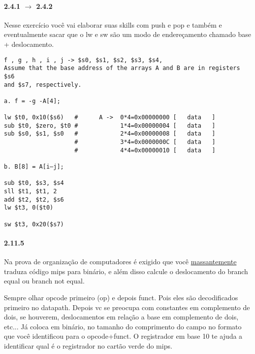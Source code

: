 \documentclass{article}
\begin{document}
\paragraph{2.4.1 $\rightarrow$ 2.4.2}

Nesse exercício você vai elaborar suas skills com push e pop e também e
eventualmente sacar que o lw e sw são um modo de endereçamento chamado base +
deslocamento.

\begin{verbatim}
f , g , h , i , j -> $s0, $s1, $s2, $s3, $s4,
Assume that the base address of the arrays A and B are in registers $s6
and $s7, respectively.

a. f = -g -A[4];

lw $t0, 0x10($s6)   #      A ->  0*4=0x00000000 [   data   ]
sub $t0, $zero, $t0 #            1*4=0x00000004 [   data   ]
sub $s0, $s1, $s0   #            2*4=0x00000008 [   data   ]
                    #            3*4=0x0000000C [   data   ]
                    #            4*4=0x00000010 [   data   ]

b. B[8] = A[i–j];

sub $t0, $s3, $s4
sll $t1, $t1, 2
add $t2, $t2, $s6
lw $t3, 0($t0)

sw $t3, 0x20($s7)
\end{verbatim}

\paragraph{2.11.5}

Na prova de organização de computadores é exigido que você
\underline{massantemente} traduza código mips para binário, e além disso calcule
o deslocamento do branch equal ou branch not equal.

Sempre olhar opcode primeiro (op) e depois funct. Pois eles são decodificados
primeiro no datapath. Depois vc se preocupa com constantes em complemento de
dois, se houverem, deslocamentos em relação a base em complemento de dois,
etc... Já coloca em binário, no tamanho do comprimento do campo no formato que
você identificou para o opcode+funct. O registrador em base 10 te ajuda a
identificar qual é o registrador no cartão verde do mips.
\end{document}
